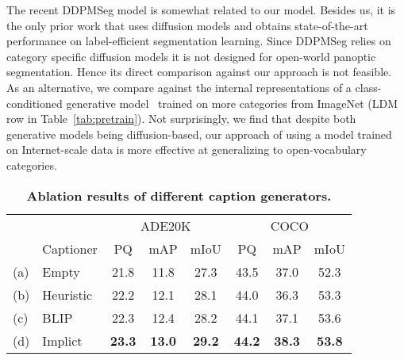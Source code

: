 \documentclass[10pt,twocolumn,letterpaper]{article}
\newcommand{\tablestyle}[2]{\setlength{\tabcolsep}{#1}\renewcommand{\arraystretch}{#2}\centering\small}
\begin{document}
The recent DDPMSeg\cite{baranchuk2021ddpmseg} model  is somewhat related to our model. Besides us, it is the only prior work that uses diffusion models and obtains state-of-the-art performance on label-efficient segmentation learning. 
Since DDPMSeg relies on category specific diffusion models it is not designed for open-world panoptic segmentation. Hence its direct comparison against our approach is not feasible.
As an alternative, we compare against the internal representations of a class-conditioned generative model~\cite{rombach2022ldm} trained on more categories from ImageNet\cite{deng2009imagenet} (LDM row in  Table~\ref{tab:pretrain}). 
Not surprisingly, we find that despite both generative models being diffusion-based, our approach of using a model trained on Internet-scale data is more effective at generalizing to open-vocabulary categories.


\begin{table}[]
\vspace{-.5em}
\tablestyle{4pt}{1.1}
\begin{tabular}{ll|ccc|ccc}
    &                                  & \multicolumn{3}{c|}{ADE20K}                    & \multicolumn{3}{c}{COCO}                      \\
    & Captioner                        & PQ            & mAP           & mIoU          & PQ            & mAP           & mIoU          \\
\shline
(a) & Empty                            & 21.8          & 11.8          & 27.3          & 43.5          & 37.0          & 52.3          \\
(b) & Heuristic\cite{zeng2022socratic} & 22.2          & 12.1          & 28.1          & 44.0          & 36.3          & 53.3          \\
(c) & BLIP\cite{li2022blip}            & 22.3          & 12.4          & 28.2          & 44.1          & 37.1          & 53.6          \\
(d) & Implict                          & \textbf{23.3} & \textbf{13.0} & \textbf{29.2} & \textbf{44.2} & \textbf{38.3} & \textbf{53.8}
\end{tabular}
\vspace{-1em}
\caption{
    \label{tab:captioner}
    \textbf{Ablation results of different caption generators.}
}
\vspace{-2em}
\end{table}
\end{document}
